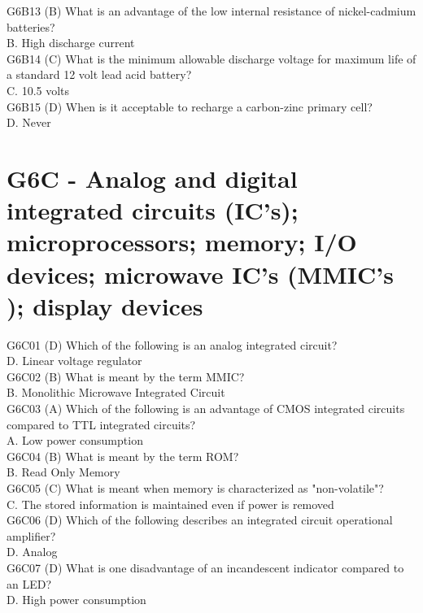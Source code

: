 \documentclass[12pt,letterpaper]{report}
\begin{document}
G6B13 (B) What is an advantage of the low internal resistance of nickel-cadmium batteries?\\
B. High discharge current\\

G6B14 (C) What is the minimum allowable discharge voltage for maximum life of a standard 12 volt lead acid battery?\\
C. 10.5 volts\\

G6B15 (D) When is it acceptable to recharge a carbon-zinc primary cell?\\
D. Never\\

\section{G6C - Analog and digital integrated circuits (IC's); microprocessors; memory; I/O devices; microwave IC's (MMIC's ); display devices}

G6C01 (D) Which of the following is an analog integrated circuit?\\
D. Linear voltage regulator\\

G6C02 (B) What is meant by the term MMIC?\\
B. Monolithic Microwave Integrated Circuit\\

G6C03 (A) Which of the following is an advantage of CMOS integrated circuits compared to TTL integrated circuits?\\
A. Low power consumption\\

G6C04 (B) What is meant by the term ROM?\\
B. Read Only Memory\\

G6C05 (C) What is meant when memory is characterized as "non-volatile"?\\
C. The stored information is maintained even if power is removed\\

G6C06 (D) Which of the following describes an integrated circuit operational amplifier?\\
D. Analog\\

G6C07 (D) What is one disadvantage of an incandescent indicator compared to an LED?\\
D. High power consumption\\
\end{document}
